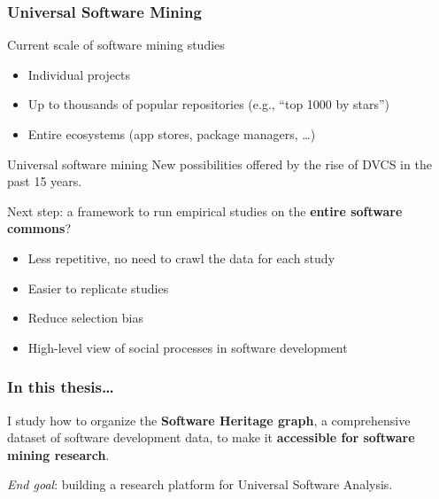 \documentclass[aspectratio=169,xcolor=table]{beamer}
\begin{document}
    \begin{frame}
        \frametitle{Universal Software Mining}

        \begin{block}{Current scale of software mining studies}
            \begin{itemize}
                \item Individual projects
                \item Up to thousands of popular repositories (e.g., ``top
                    1000 by stars'')
                \item Entire ecosystems (app stores, package managers, …)
            \end{itemize}
        \end{block}

        \begin{block}{Universal software mining}
            New possibilities offered by the rise of DVCS in the past 15 years.

            Next step: a framework to run empirical studies on the
            \textbf{entire software commons}?

            \begin{itemize}
                \item Less repetitive, no need to crawl the data for each study
                \item Easier to replicate studies
                \item Reduce selection bias
                \item High-level view of social processes in software
                    development
            \end{itemize}
        \end{block}
    \end{frame}

    \begin{frame}
        \frametitle{In this thesis…}

        \begin{block}{}
            I study how to organize the \textbf{Software Heritage graph}, a
            comprehensive dataset of software development data, to make it
            \textbf{accessible for software mining research}.
        \end{block}

        \begin{block}{}
            \emph{End goal}: building a research platform for Universal
            Software Analysis.
        \end{block}
    \end{frame}
\end{document}
